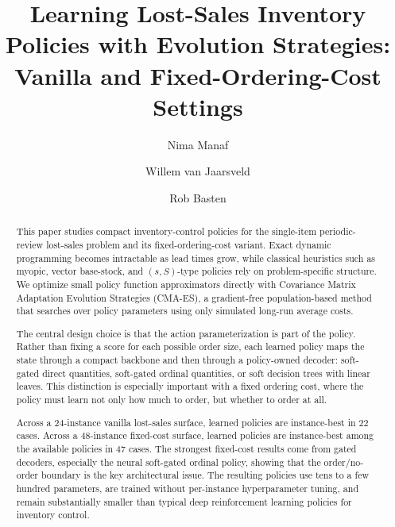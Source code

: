 \documentclass[authoryear,11pt]{elsarticle}
\begin{document}
\begin{frontmatter}


\title{Learning Lost-Sales Inventory Policies with Evolution Strategies:\\ Vanilla and Fixed-Ordering-Cost Settings}

\author{Nima Manaf}
\author{Willem van Jaarsveld}
\author{Rob Basten}

\begin{abstract}
This paper studies compact inventory-control policies for the single-item periodic-review lost-sales problem and its fixed-ordering-cost variant. Exact dynamic programming becomes intractable as lead times grow, while classical heuristics such as myopic, vector base-stock, and $(s,S)$-type policies rely on problem-specific structure. We optimize small policy function approximators directly with Covariance Matrix Adaptation Evolution Strategies (CMA-ES), a gradient-free population-based method that searches over policy parameters using only simulated long-run average costs.

The central design choice is that the action parameterization is part of the policy. Rather than fixing a score for each possible order size, each learned policy maps the state through a compact backbone and then through a policy-owned decoder: soft-gated direct quantities, soft-gated ordinal quantities, or soft decision trees with linear leaves. This distinction is especially important with a fixed ordering cost, where the policy must learn not only how much to order, but whether to order at all.

Across a 24-instance vanilla lost-sales surface, learned policies are instance-best in 22 cases. Across a 48-instance fixed-cost surface, learned policies are instance-best among the available policies in 47 cases. The strongest fixed-cost results come from gated decoders, especially the neural soft-gated ordinal policy, showing that the order/no-order boundary is the key architectural issue. The resulting policies use tens to a few hundred parameters, are trained without per-instance hyperparameter tuning, and remain substantially smaller than typical deep reinforcement learning policies for inventory control.
\end{abstract}


\end{frontmatter}
\end{document}

